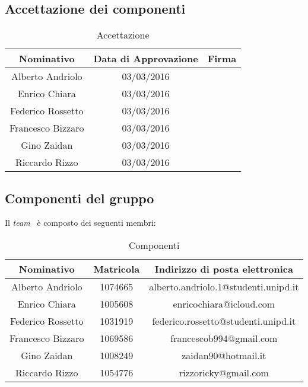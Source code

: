 \subsection{Accettazione dei componenti}
\begin{table}[h]
\centering
\bgroup
\def\arraystretch{3}
\begin{tabular}{| c | c | p{5cm} |}
\hline
\textbf{Nominativo} & \textbf{Data di Approvazione} & \textbf{Firma}\\ \hline \hline
Alberto Andriolo & 03/03/2016 & 
\\ \hline  
Enrico Chiara & 03/03/2016 & 
\\ \hline
Federico Rossetto & 03/03/2016 & 
\\ \hline
Francesco Bizzaro & 03/03/2016 & 
\\ \hline
Gino Zaidan & 03/03/2016 & 
\\ \hline
Riccardo Rizzo & 03/03/2016 & 
\\ \hline
\end{tabular}
\egroup
\caption{Accettazione}
\end{table}

\newpage

\subsection{Componenti del gruppo}
Il \textit{team} \GRUPPO\ è composto dei seguenti membri:
\begin{table}[h]
\centering
\bgroup
\def\arraystretch{1.6}
	\begin{tabular}{| c | c | c |}
		\hline
		\textbf{Nominativo} & \textbf{Matricola} & \textbf{Indirizzo di posta 
		elettronica} \\ \hline \hline 
		Alberto Andriolo & 1074665 & alberto.andriolo.1@studenti.unipd.it 
		\\ \hline
		Enrico Chiara & 1005608 & enricochiara@icloud.com \\ \hline
		Federico Rossetto & 1031919 & federico.rossetto@studenti.unipd.it \\ 
		\hline
		Francesco Bizzaro & 1069586 & francescob994@gmail.com  \\ \hline  
		Gino Zaidan & 1008249 & zaidan90@hotmail.it  \\ \hline 
		Riccardo Rizzo & 1054776 & rizzoricky@gmail.com  \\ \hline
	\end{tabular}
\egroup
\caption{Componenti}
\end{table}

